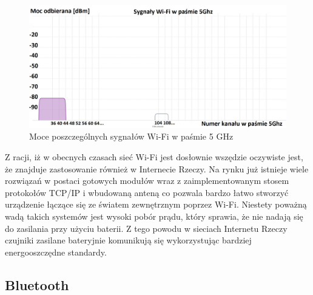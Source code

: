 \documentclass[12pt, twoside, openany]{mwrep}
\begin{document}
\begin{figure}[H]
\centering
\includegraphics[width=\textwidth]{5GHz}
\caption{Moce poszczególnych sygnałów Wi-Fi w paśmie 5 GHz}
\end{figure}

\par
Z racji, iż w obecnych czasach sieć Wi-Fi jest dosłownie wszędzie oczywiste jest, że znajduje zastosowanie również w Internecie Rzeczy. Na rynku już istnieje wiele rozwiązań w postaci gotowych modułów wraz z zaimplementowanym stosem protokołów TCP/IP i wbudowaną anteną co pozwala bardzo łatwo stworzyć urządzenie łączące się ze światem zewnętrznym poprzez Wi-Fi. Niestety poważną wadą takich systemów jest wysoki pobór prądu, który sprawia, że nie nadają się do zasilania przy użyciu baterii. Z tego powodu w sieciach Internetu Rzeczy czujniki zasilane bateryjnie komunikują się wykorzystując bardziej energooszczędne standardy.

\subsection{Bluetooth}
\end{document}

